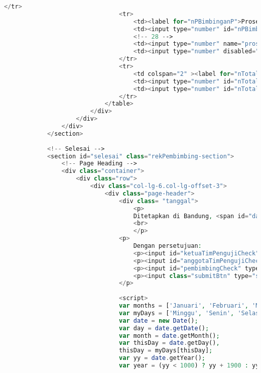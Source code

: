 \begin{lstlisting}[language=PHP,basicstyle=\tiny,caption=skripsi.php]
								</tr>
								<tr>
									<td><label for="nPBimbinganP">Proses Bimbingan</label></td>
									<td><input type="number" id="nPBimbinganP" max="100" ng-model="nilai_PBimbinganP" class="form-nilai"/></td>
									<!-- 28 -->
									<td><input type="number" name="prosesBimbinganPembimbing" ng-model="PBimbinganP.value" ng-init="PBimbinganP.value = 30" min="0" max="100" class="form-nilai" readonly="readonly" /></td>
									<td><input type="number" disabled="disabled" value="{{nilai_PBimbinganP * PBimbinganP.value / 100}}" ng-model="total_PBimbinganP" class="form-nilai"/></td>
								</tr>
								<tr>
									<td colspan="2" ><label for="nTotalBobotP">Total</label></td>
									<td><input type="number" id="nTotalBobotP" max="100" disabled="disabled" value={{TTLaporanP.value+KMateriP.value+PMateriP.value+PBimbinganP.value}} class="form-nilai"/></td>
									<td><input type="number" id="nTotalPembimbing" ng-model="nTotalPembimbing" max="100"  value= "{{nilai_TTLaporanP * TTLaporanP.value / 100 + nilai_KMateriP * KMateriP.value / 100 + nilai_PMateriP * PMateriP.value / 100 + nilai_PBimbinganP * PBimbinganP.value / 100}}" class="form-nilai" disabled="disabled" /></td>
								</tr>
							</table>
						</div>
					</div>
				</div>
			</section>
			
			<!-- Selesai -->
			<section id="selesai" class="rekPembimbing-section">
				<!-- Page Heading -->
				<div class="container">
					<div class="row">
						<div class="col-lg-6.col-lg-offset-3">
							<div class="page-header">
								<div class= "tanggal">
									<p>
									Ditetapkan di Bandung, <span id="date"></span>
									<br>
									</p>
								<p>
									Dengan persetujuan:
									<p><input id="ketuaTimPengujiCheck" type="checkbox" value="1" required><label for="ketuaTimPengujiCheck">Ketua tim penguji (<span ng-bind="namaKetuaTimPenguji"></span>)</label></p>
									<p><input id="anggotaTimPengujiCheck" type="checkbox" value="1" required><label for="anggotaTimPengujiCheck">Anggota tim penguji (<span ng-bind="namaAnggotaTimPenguji"></span>)</label></p>
									<p><input id="pembimbingCheck" type="checkbox" value="1" required><label for="pembimbingCheck"> Pembimbing (<span ng-bind="namaPembimbing"></span>)</label></p>
									<p><input class="submitBtn" type="submit" name="submit" value="Selesai" ></p>
								</p>
								
								<script>
								var months = ['Januari', 'Februari', 'Maret', 'April', 'Mei', 'Juni', 'Juli', 'Agustus', 'September', 'Oktober', 'November', 'Desember'];
								var myDays = ['Minggu', 'Senin', 'Selasa', 'Rabu', 'Kamis', 'Jum&#39;at', 'Sabtu'];
								var date = new Date();
								var day = date.getDate();
								var month = date.getMonth();
								var thisDay = date.getDay(),
								thisDay = myDays[thisDay];
								var yy = date.getYear();
								var year = (yy < 1000) ? yy + 1900 : yy;
								

\end{lstlisting}
